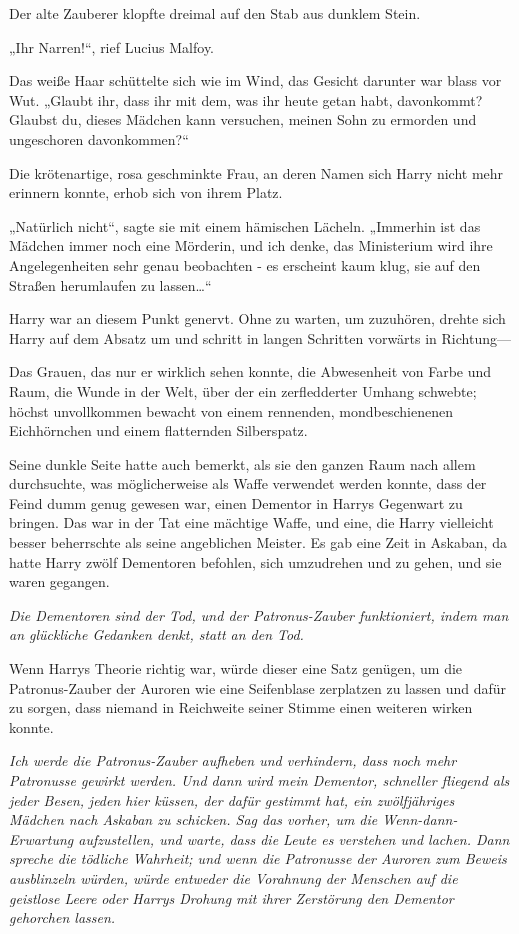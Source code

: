 {Der alte Zauberer klopfte dreimal auf den Stab aus dunklem Stein.

„Ihr Narren!“, rief Lucius Malfoy.

Das weiße Haar schüttelte sich wie im Wind, das Gesicht darunter war blass vor Wut. „Glaubt ihr, dass ihr mit dem, was ihr heute getan habt, davonkommt? Glaubst du, dieses Mädchen kann versuchen, meinen Sohn zu ermorden und ungeschoren davonkommen?“

Die krötenartige, rosa geschminkte Frau, an deren Namen sich Harry nicht mehr erinnern konnte, erhob sich von ihrem Platz.

„Natürlich nicht“, sagte sie mit einem hämischen Lächeln. „Immerhin ist das Mädchen immer noch eine Mörderin, und ich denke, das Ministerium wird ihre Angelegenheiten sehr genau beobachten - es erscheint kaum klug, sie auf den Straßen herumlaufen zu lassen…“

Harry war an diesem Punkt genervt. Ohne zu warten, um zuzuhören, drehte sich Harry auf dem Absatz um und schritt in langen Schritten vorwärts in Richtung—

Das Grauen, das nur er wirklich sehen konnte, die Abwesenheit von Farbe und Raum, die Wunde in der Welt, über der ein zerfledderter Umhang schwebte; höchst unvollkommen bewacht von einem rennenden, mondbeschienenen Eichhörnchen und einem flatternden Silberspatz.

Seine dunkle Seite hatte auch bemerkt, als sie den ganzen Raum nach allem durchsuchte, was möglicherweise als Waffe verwendet werden konnte, dass der Feind dumm genug gewesen war, einen Dementor in Harrys Gegenwart zu bringen. Das war in der Tat eine mächtige Waffe, und eine, die Harry vielleicht besser beherrschte als seine angeblichen Meister. Es gab eine Zeit in Askaban, da hatte Harry zwölf Dementoren befohlen, sich umzudrehen und zu gehen, und sie waren gegangen.

\emph{Die Dementoren sind der Tod, und der Patronus-Zauber funktioniert, indem man an glückliche Gedanken denkt, statt an den Tod.}

Wenn Harrys Theorie richtig war, würde dieser eine Satz genügen, um die Patronus-Zauber der Auroren wie eine Seifenblase zerplatzen zu lassen und dafür zu sorgen, dass niemand in Reichweite seiner Stimme einen weiteren wirken konnte.

\emph{Ich werde die Patronus-Zauber aufheben und verhindern, dass noch mehr Patronusse gewirkt werden. Und dann wird mein Dementor, schneller fliegend als jeder Besen,} \emph{jeden hier küssen, der dafür gestimmt hat, ein zwölfjähriges Mädchen nach Askaban zu schicken. Sag das vorher, um die Wenn-dann-Erwartung aufzustellen, und warte, dass die Leute es verstehen und lachen. Dann spreche die tödliche Wahrheit; und wenn die Patronusse der Auroren zum Beweis ausblinzeln würden, würde entweder die Vorahnung der Menschen auf die geistlose Leere oder Harrys Drohung mit ihrer Zerstörung den Dementor gehorchen lassen.}

}
